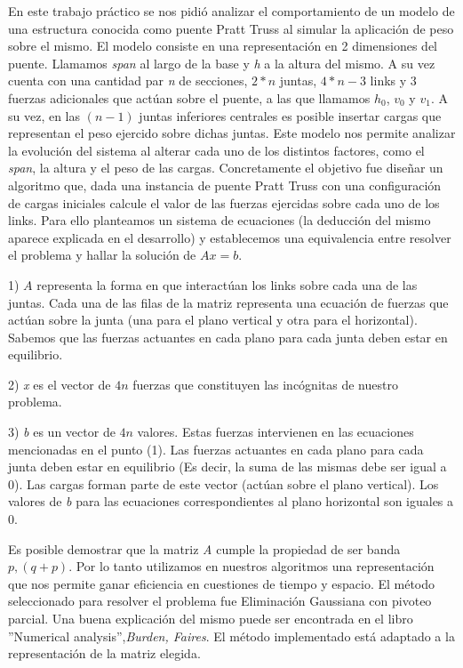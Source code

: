 	En este trabajo práctico se nos pidió analizar el comportamiento de un modelo de una estructura conocida como 
puente Pratt Truss al simular la aplicación de peso sobre el mismo.
	El modelo consiste en una representación en 2 dimensiones del puente. Llamamos \emph{span} al largo de la base 
y \emph{h} a la altura del mismo. A su vez cuenta con una cantidad par \emph{n} de secciones, $2*n$
juntas, $4*n-3$ links y 3 fuerzas adicionales que actúan sobre el puente, a las que llamamos $h_{0}$, $v_{0}$ y
$v_{1}$.
	A su vez, en las $(n-1)$ juntas inferiores centrales es posible insertar cargas que representan el peso 
ejercido sobre dichas juntas.
	Este modelo nos permite analizar la evolución del sistema al alterar cada uno de los distintos factores,
como el \emph{span}, la altura y el peso de las cargas.
	Concretamente el objetivo fue diseñar un algoritmo que, dada una instancia de puente Pratt Truss con una configuración de
cargas iniciales calcule el valor de las fuerzas ejercidas sobre cada uno de los links.
	Para ello planteamos un sistema de ecuaciones (la deducción del mismo aparece explicada en el desarrollo) y
establecemos una equivalencia entre resolver el problema y hallar la solución de $Ax = b$.

1) $A$ representa la forma en que interactúan los links sobre cada una de las juntas. Cada una de las filas de la matriz 
representa una ecuación de fuerzas que actúan sobre la junta (una para el plano vertical y otra para el horizontal). Sabemos
que las fuerzas actuantes en cada plano para cada junta deben estar en equilibrio.

2) \emph{x} es el vector de $4n$ fuerzas que constituyen las incógnitas de nuestro problema.

3) \emph{b} es un vector de $4n$ valores. Estas fuerzas intervienen en las ecuaciones mencionadas en el punto (1). Las fuerzas
actuantes en cada plano para cada junta deben estar en equilibrio (Es decir, la suma de las mismas debe ser igual a 0). Las
cargas forman parte de este vector (actúan sobre el plano vertical). Los valores de \emph{b} para las ecuaciones
correspondientes al plano horizontal son iguales a 0.

Es posible demostrar que la matriz \emph{A} cumple la propiedad de ser banda $p,(q+p)$. Por lo tanto utilizamos en nuestros
algoritmos una representación que nos permite ganar eficiencia en cuestiones de tiempo y espacio.
El método seleccionado para resolver el problema fue Eliminación Gaussiana con pivoteo parcial. Una buena explicación del
mismo puede ser encontrada en el libro ''Numerical analysis'',\emph{Burden, Faires}. El método implementado está adaptado
a la representación de la matriz elegida.

